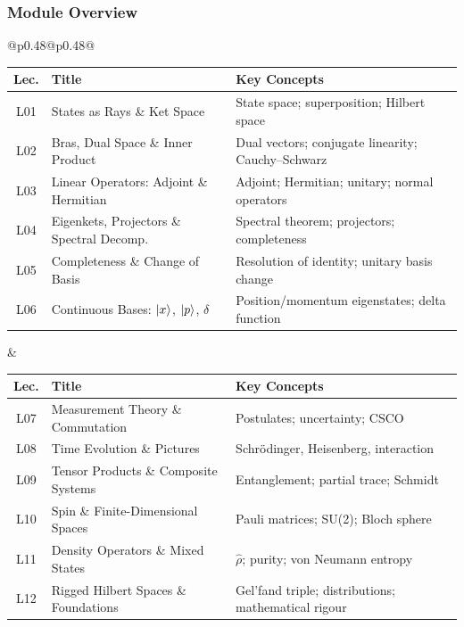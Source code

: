 \documentclass[11pt,a4paper]{article}
\begin{document}
\subsubsection*{Module Overview}

\begin{center}
\begin{tabular}{@{}p{}@{\textwidth}p{}@{}}
\begin{tabular}[t]{@{}clp{4.2cm}@{}}
\toprule
\textbf{Lec.} & \textbf{Title} & \textbf{Key Concepts}\\
\midrule
L01 & States as Rays \& Ket Space & State space; superposition; Hilbert space\\
L02 & Bras, Dual Space \& Inner Product & Dual vectors; conjugate linearity; Cauchy--Schwarz\\
L03 & Linear Operators: Adjoint \& Hermitian & Adjoint; Hermitian; unitary; normal operators\\
L04 & Eigenkets, Projectors \& Spectral Decomp. & Spectral theorem; projectors; completeness\\
L05 & Completeness \& Change of Basis & Resolution of identity; unitary basis change\\
L06 & Continuous Bases: $\ket{x}$, $\ket{p}$, $\delta$ & Position/momentum eigenstates; delta function\\
\bottomrule
\end{tabular}
&
\begin{tabular}[t]{@{}clp{4.2cm}@{}}
\toprule
\textbf{Lec.} & \textbf{Title} & \textbf{Key Concepts}\\
\midrule
L07 & Measurement Theory \& Commutation & Postulates; uncertainty; CSCO\\
L08 & Time Evolution \& Pictures & Schr\"odinger, Heisenberg, interaction\\
L09 & Tensor Products \& Composite Systems & Entanglement; partial trace; Schmidt\\
L10 & Spin \& Finite-Dimensional Spaces & Pauli matrices; SU(2); Bloch sphere\\
L11 & Density Operators \& Mixed States & $\hat\rho$; purity; von Neumann entropy\\
L12 & Rigged Hilbert Spaces \& Foundations & Gel'fand triple; distributions; mathematical rigour\\
\bottomrule
\end{tabular}
\\
\end{tabular}
\end{center}
\end{document}
